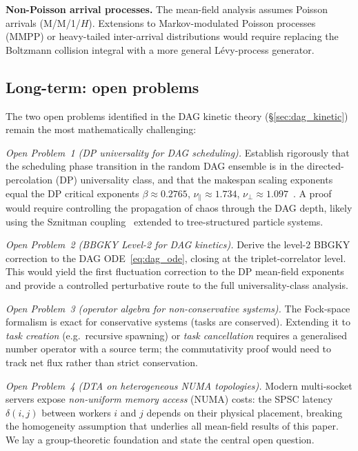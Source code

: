 \documentclass[11pt,a4paper]{article}
\begin{document}
\medskip
\noindent\textbf{Non-Poisson arrival processes.}
The mean-field analysis assumes Poisson arrivals (M/M/1/$H$).
Extensions to Markov-modulated Poisson processes (MMPP) or heavy-tailed
inter-arrival distributions would require replacing the Boltzmann
collision integral with a more general L\'evy-process generator.

\subsection{Long-term: open problems}

The two open problems identified in the DAG kinetic theory
(\S\ref{sec:dag_kinetic}) remain the most mathematically challenging:

\medskip
\noindent\textit{Open Problem~1 (DP universality for DAG scheduling).}
Establish rigorously that the scheduling phase transition in the random
DAG ensemble is in the directed-percolation (DP) universality class,
and that the makespan scaling exponents equal the DP critical exponents
$\beta \approx 0.2765$, $\nu_\parallel \approx 1.734$,
$\nu_\perp \approx 1.097$~\cite{hinrichsen2000}.
A proof would require controlling the propagation of chaos through the
DAG depth, likely using the Sznitman coupling~\cite{sznitman1991}
extended to tree-structured particle systems.

\medskip
\noindent\textit{Open Problem~2 (BBGKY Level-2 for DAG kinetics).}
Derive the level-2 BBGKY correction to the DAG ODE~\eqref{eq:dag_ode},
closing at the triplet-correlator level.  This would yield the first
fluctuation correction to the DP mean-field exponents and provide a
controlled perturbative route to the full universality-class analysis.

\medskip
\noindent\textit{Open Problem~3 (operator algebra for non-conservative systems).}
The Fock-space formalism is exact for conservative systems (tasks are
conserved).  Extending it to \emph{task creation} (e.g.\ recursive
spawning) or \emph{task cancellation} requires a generalised number
operator with a source term; the commutativity proof would need to track
net flux rather than strict conservation.

\medskip
\noindent\textit{Open Problem~4 (DTA on heterogeneous NUMA topologies).}
Modern multi-socket servers expose \emph{non-uniform memory access} (NUMA)
costs: the SPSC latency $\delta(i,j)$ between workers $i$ and $j$ depends
on their physical placement, breaking the homogeneity assumption that
underlies all mean-field results of this paper.  We lay a group-theoretic
foundation and state the central open question.
\end{document}
